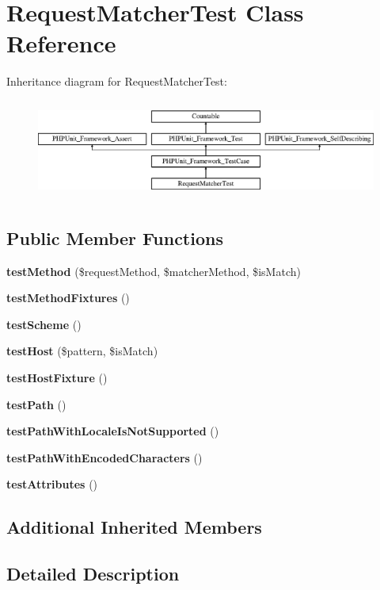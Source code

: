 \section{Request\+Matcher\+Test Class Reference}
\label{class_symfony_1_1_component_1_1_http_foundation_1_1_tests_1_1_request_matcher_test}
Inheritance diagram for Request\+Matcher\+Test\+:\begin{figure}[H]
\begin{center}
\leavevmode
\includegraphics[height=3.303835cm]{class_symfony_1_1_component_1_1_http_foundation_1_1_tests_1_1_request_matcher_test}
\end{center}
\end{figure}
\subsection*{Public Member Functions}
\begin{DoxyCompactItemize}
\item 
{\bf test\+Method} (\$request\+Method, \$matcher\+Method, \$is\+Match)
\item 
{\bf test\+Method\+Fixtures} ()
\item 
{\bf test\+Scheme} ()
\item 
{\bf test\+Host} (\$pattern, \$is\+Match)
\item 
{\bf test\+Host\+Fixture} ()
\item 
{\bf test\+Path} ()
\item 
{\bf test\+Path\+With\+Locale\+Is\+Not\+Supported} ()
\item 
{\bf test\+Path\+With\+Encoded\+Characters} ()
\item 
{\bf test\+Attributes} ()
\end{DoxyCompactItemize}
\subsection*{Additional Inherited Members}


\subsection{Detailed Description}


